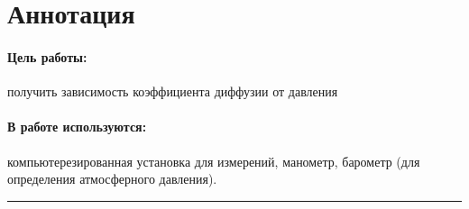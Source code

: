 \documentclass[a4paper,12pt]{report}
\begin{document}
	
	\newpage
    \pagestyle{fancy}

    \fancyhead{}
    \fancyfoot{}
    \fancyhead[L]{\rightmark}
    \fancyhead[R]{\thepage}

    \section*{Аннотация}
        \paragraph*{Цель работы:} получить зависимость коэффициента диффузии от давления
        \paragraph*{В работе используются:} компьютерезированная установка для измерений, манометр, барометр (для определения атмосферного давления). 
    \vspace{0.5cm}
    \hrule
\end{document}
